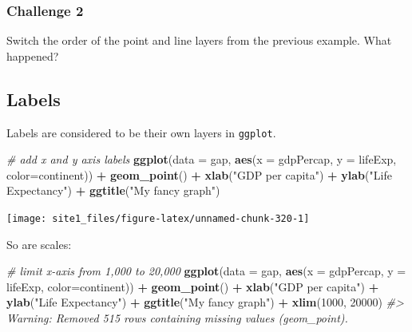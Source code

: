 \documentclass[]{book}
\newenvironment{Shaded}{\begin{snugshade}}{\end{snugshade}}
\newcommand{\KeywordTok}[1]{\textcolor[rgb]{0.13,0.29,0.53}{\textbf{#1}}}
\newcommand{\DataTypeTok}[1]{\textcolor[rgb]{0.13,0.29,0.53}{#1}}
\newcommand{\DecValTok}[1]{\textcolor[rgb]{0.00,0.00,0.81}{#1}}
\newcommand{\StringTok}[1]{\textcolor[rgb]{0.31,0.60,0.02}{#1}}
\newcommand{\CommentTok}[1]{\textcolor[rgb]{0.56,0.35,0.01}{\textit{#1}}}
\newcommand{\OperatorTok}[1]{\textcolor[rgb]{0.81,0.36,0.00}{\textbf{#1}}}
\newcommand{\NormalTok}[1]{#1}
\begin{document}
\subsubsection*{Challenge 2}\label{challenge-2-1}

Switch the order of the point and line layers from the previous example.
What happened?

\subsection{Labels}\label{labels-1}

Labels are considered to be their own layers in \texttt{ggplot}.

\begin{Shaded}
\begin{Highlighting}[]
\CommentTok{# add x and y axis labels}
\KeywordTok{ggplot}\NormalTok{(}\DataTypeTok{data =}\NormalTok{ gap, }\KeywordTok{aes}\NormalTok{(}\DataTypeTok{x =}\NormalTok{ gdpPercap, }\DataTypeTok{y =}\NormalTok{ lifeExp, }\DataTypeTok{color=}\NormalTok{continent)) }\OperatorTok{+}\StringTok{ }
\StringTok{  }\KeywordTok{geom_point}\NormalTok{() }\OperatorTok{+}\StringTok{ }
\StringTok{  }\KeywordTok{xlab}\NormalTok{(}\StringTok{"GDP per capita"}\NormalTok{) }\OperatorTok{+}\StringTok{ }
\StringTok{  }\KeywordTok{ylab}\NormalTok{(}\StringTok{"Life Expectancy"}\NormalTok{) }\OperatorTok{+}\StringTok{ }
\StringTok{  }\KeywordTok{ggtitle}\NormalTok{(}\StringTok{"My fancy graph"}\NormalTok{)}
\end{Highlighting}
\end{Shaded}

\begin{center}\texttt{[image: site1\_files/figure-latex/unnamed-chunk-320-1]} \end{center}

So are scales:

\begin{Shaded}
\begin{Highlighting}[]
\CommentTok{# limit x-axis from 1,000 to 20,000}
\KeywordTok{ggplot}\NormalTok{(}\DataTypeTok{data =}\NormalTok{ gap, }\KeywordTok{aes}\NormalTok{(}\DataTypeTok{x =}\NormalTok{ gdpPercap, }\DataTypeTok{y =}\NormalTok{ lifeExp, }\DataTypeTok{color=}\NormalTok{continent)) }\OperatorTok{+}\StringTok{ }
\StringTok{  }\KeywordTok{geom_point}\NormalTok{() }\OperatorTok{+}\StringTok{ }
\StringTok{  }\KeywordTok{xlab}\NormalTok{(}\StringTok{"GDP per capita"}\NormalTok{) }\OperatorTok{+}\StringTok{ }
\StringTok{  }\KeywordTok{ylab}\NormalTok{(}\StringTok{"Life Expectancy"}\NormalTok{) }\OperatorTok{+}\StringTok{ }
\StringTok{  }\KeywordTok{ggtitle}\NormalTok{(}\StringTok{"My fancy graph"}\NormalTok{) }\OperatorTok{+}\StringTok{ }
\StringTok{  }\KeywordTok{xlim}\NormalTok{(}\DecValTok{1000}\NormalTok{, }\DecValTok{20000}\NormalTok{)}
\CommentTok{#> Warning: Removed 515 rows containing missing values (geom_point).}
\end{Highlighting}
\end{Shaded}
\end{document}
